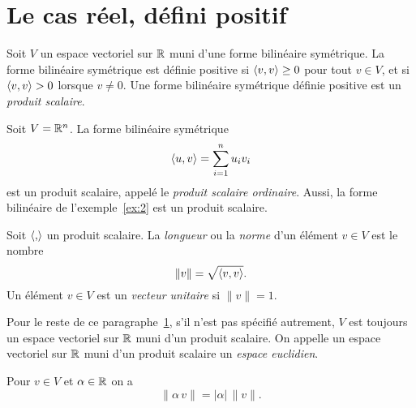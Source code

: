 \section{Le cas réel, défini positif}
\label{sec:le-case-reel}



\begin{definition}
  \label{def:4}
  Soit $V$ un espace vectoriel sur $\mathbb{R}$ muni 
  d'une forme bilinéaire symétrique. 
  La forme bilinéaire symétrique  est définie positive si $\langle {v,v} \rangle \geq 0$ pour tout $v \in V$, et si $\langle {v,v} \rangle>0$ lorsque $v \neq 0$. Une forme bilinéaire symétrique définie positive est un \emph{produit scalaire}. 
\end{definition}

\begin{example}
  \label{exe:3}
  Soit $V = \mathbb{R}^n$. La forme bilinéaire symétrique
  \begin{displaymath}
    \langle {u,v} \rangle = \sum_{i=1}^n u_iv_i 
  \end{displaymath}
  est un produit scalaire, appelé le \emph{produit scalaire ordinaire}. 
  Aussi, la forme bilinéaire  de l'exemple~\ref{ex:2} est un produit scalaire. 
\end{example}

\begin{definition}
  \label{def:5}
  Soit $\langle {,} \rangle$ un produit scalaire. La \emph{longueur} ou la \emph{norme} d'un élément $v \in V$ est le nombre 
  \begin{displaymath}
    \| v \| = \sqrt{\langle {v,v} \rangle}.
  \end{displaymath}
  Un élément $v \in V$ est un \emph{vecteur unitaire} si $\|v\| = 1$. 
\end{definition}


\begin{framed}\noindent 
  Pour le reste de ce paragraphe~\ref{sec:le-case-reel}, s'il n'est pas spécifié autrement,  $V$
  est toujours un espace vectoriel sur $\mathbb{R}$
  muni d'un produit scalaire. 
On appelle un  espace vectoriel sur $\mathbb{R}$ muni d'un produit scalaire  un \emph{espace euclidien}.  
\end{framed}



\begin{proposition}
  \label{prop:2}
  Pour $v \in V$ et $\alpha \in \mathbb{R}$ on a
  \begin{displaymath}
    \| \alpha \,v \| = |\alpha| \, \|v\|. 
  \end{displaymath}
\end{proposition}



